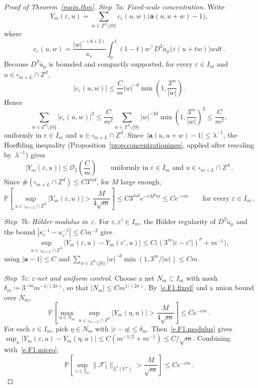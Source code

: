 \documentclass[11pt]{amsart}
\theoremstyle{plain}
\theoremstyle{definition}
\theoremstyle{remark}
\newcommand{\Zd}{\mathbb{Z}^d}
\renewcommand{\a}{\mathbf{a}}
\newcommand{\cu}{\square}
\newcommand{\eps}{\varepsilon}
\renewcommand{\P}{\mathbb{P}}
\begin{document}
\begin{proof}[Proof of Theorem~\ref{main.thm}]
		\emph{Step~7a: Fixed-scale concentration.}
		Write
		\[
		Y_m(\eps, u) = \sum_{w \in \Zd \setminus \{0\}} c_\eps(u,w) \bigl(\a(u, u{+}w) - 1\bigr),
		\]
		where
		\[
		c_\eps(u,w) = \frac{|w|^{-(d+2)}}{\kappa_\eps} \int_0^1 (1{-}t) w^\top D^2\widetilde u_\mu\bigl(\eps(u{+}tw)\bigr) w dt\,.
		\]
		Because $D^2\widetilde u_\mu$ is bounded and compactly supported, for every $\eps \in I_m$ and $u \in \cu_{m+L} \cap \Zd$,
		\[
		|c_\eps(u,w)| \le \frac{C}{m} |w|^{-d} \min\left(1, \frac{3^m}{|w|}\right).
		\]
		Hence
		\[
		\sum_{w \in \Zd \setminus \{0\}} |c_\eps(u,w)|^2 \le \frac{C}{m^2} \sum_{w \in \Zd \setminus \{0\}} |w|^{-2d} \min\left(1, \frac{3^m}{|w|}\right)^2 \le \frac{C}{m^2},
		\]
		uniformly in $\eps \in I_m$ and $u \in \cu_{m+L} \cap \Zd$.
		Since~$|\a(u,u{+}w) - 1| \le \lambda^{-1}$, the Hoeffding inequality (Proposition~\ref{prop:concentrationineq}, applied after rescaling by~$\lambda^{-1}$) gives
		\[
		|Y_m(\eps, u)| \le \mathcal{O}_2\left(\frac{C}{m}\right) \qquad \text{uniformly in } \eps \in I_m \text{ and } u \in \cu_{m+L} \cap \Zd\,.
		\]
		Since $\#(\cu_{m+L} \cap \Zd) \le C 3^{md}$, for $M$ large enough,
		\begin{equation}
			\label{e.F1.fixed}
			\P\left[\sup_{u \in \cu_{m+L} \cap \Zd} |Y_m(\eps, u)| > \frac{M}{4\sqrt{m}}\right] \le C 3^{md} e^{-cM^2 m} \le Ce^{-cm} \qquad \text{for every } \eps \in I_m\,.
		\end{equation}
		
		\emph{Step~7b: H\"older modulus in~$\eps$.}
		For $\eps, \eps' \in I_m$, the H\"older regularity of $D^2\widetilde u_\mu$ and the bound $|\kappa_\eps^{-1} - \kappa_{\eps'}^{-1}| \le Cm^{-2}$ give
		\begin{equation}
			\label{e.F1.modulus}
			\sup_{u \in \cu_{m+L} \cap \Zd} |Y_m(\eps, u) - Y_m(\eps', u)| \le C\bigl((3^m|\eps - \eps'|)^\sigma + m^{-1}\bigr),
		\end{equation}
		using $|\a - 1| \le C$ and $\sum_{w \in \Zd \setminus \{0\}} |w|^{-d} \min(1, 3^m/|w|) \le Cm$.
		
		\emph{Step~7c: $\eps$-net and uniform control.}
		Choose a net $N_m \subset I_m$ with mesh $\delta_m \coloneqq 3^{-m} m^{-1/(2\sigma)}$, so that $|N_m| \le Cm^{1/(2\sigma)}$.
		By~\eqref{e.F1.fixed} and a union bound over $N_m$,
		\[
		\P\left[\max_{\eta \in N_m} \sup_{u \in \cu_{m+L} \cap \Zd} |Y_m(\eta, u)| > \frac{M}{4\sqrt{m}}\right] \le Ce^{-cm}\,.
		\]
		For each $\eps \in I_m$, pick $\eta \in N_m$ with $|\eps - \eta| \le \delta_m$.
		Then~\eqref{e.F1.modulus} gives $\sup_u |Y_m(\eps, u) - Y_m(\eta, u)| \le C(m^{-1/2} + m^{-1}) \le C/\sqrt{m}$.
		Combining with~\eqref{e.F1.micro},
		\begin{equation}
			\label{e.F1.fail}
			\P\left[\sup_{\eps \in I_m} \|\mathcal{F}_1^\eps\|_{L^2(U^\eps)} > \frac{M}{\sqrt{m}}\right] \le Ce^{-cm}\,.
		\end{equation}
		

\end{proof}
\end{document}
